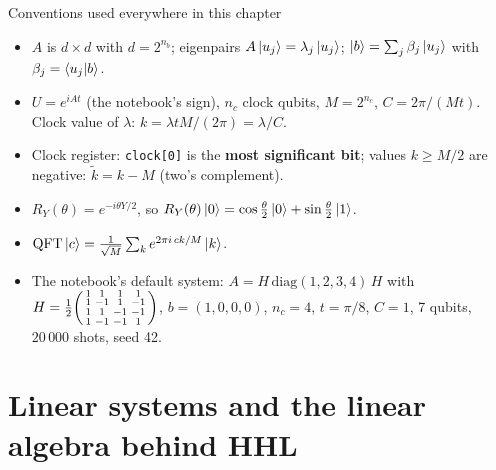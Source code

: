 \documentclass[11pt,a4paper,openany]{book}
\begin{document}
\begin{defn}{Conventions used everywhere in this chapter}
\begin{itemize}[leftmargin=1.2em, itemsep=1pt]
\item $A$ is $d\times d$ with $d = 2^{n_b}$; eigenpairs $A\ket{u_j} = \lambda_j\ket{u_j}$; $\ket b = \sum_j\beta_j\ket{u_j}$ with $\beta_j = \braket{u_j|b}$.
\item $U = e^{iAt}$ (the notebook's sign), $n_c$ clock qubits, $M = 2^{n_c}$, $C = 2\pi/(Mt)$. Clock value of $\lambda$: $k = \lambda t M/(2\pi) = \lambda/C$.
\item Clock register: \texttt{clock[0]} is the \textbf{most significant bit}; values $k \ge M/2$ are negative: $\tilde k = k - M$ (two's complement).
\item $R_Y(\theta) = e^{-i\theta Y/2}$, so $R_Y(\theta)\ket0 = \cos\frac\theta2\ket0 + \sin\frac\theta2\ket1$.
\item $\mathrm{QFT}\ket c = \frac{1}{\sqrt M}\sum_ke^{2\pi i\,ck/M}\ket k$.
\item The notebook's default system: $A = H\,\mathrm{diag}(1, 2, 3, 4)\,H$ with $H = \frac12\begin{psmallmatrix}1&1&1&1\\1&-1&1&-1\\1&1&-1&-1\\1&-1&-1&1\end{psmallmatrix}$,
      $b = (1, 0, 0, 0)$, $n_c = 4$, $t = \pi/8$, $C = 1$, 7 qubits, $20\,000$ shots, seed 42.
\end{itemize}
\end{defn}

\section{Linear systems and the linear algebra behind HHL}
\end{document}
